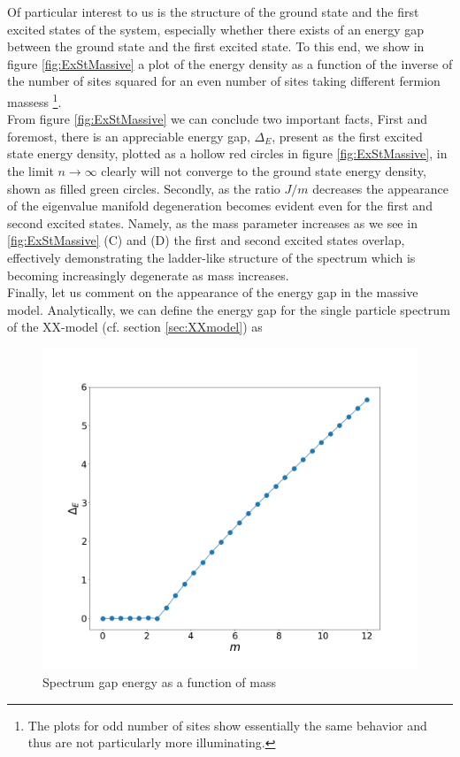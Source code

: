 Of particular interest to us is the structure of the ground state and the first excited states of the system, especially whether there exists of an energy gap between the ground state and the first excited state. To this end, we show in figure \ref{fig:ExStMassive} a plot of the energy density as a function of the inverse of the number of sites squared for an even number of sites taking different fermion massess \footnote{The plots for odd number of sites show essentially the same behavior and thus are not particularly more illuminating.}. \\

From figure \ref{fig:ExStMassive} we can conclude two important facts, First and foremost, there is an appreciable energy gap, $\Delta_E$, present as the first excited state energy density, plotted as a hollow red circles in figure \ref{fig:ExStMassive}, in the limit $n\to\infty$ clearly will not converge to the ground state energy density, shown as filled green circles. Secondly, as the ratio $J/m$ decreases the appearance of the eigenvalue manifold degeneration becomes evident even for the first and second excited states. Namely, as the mass parameter increases as we see in \ref{fig:ExStMassive} (C) and (D) the first and second excited states overlap, effectively demonstrating the ladder-like structure of the spectrum which is becoming increasingly degenerate as mass increases.\\


Finally, let us comment on the appearance of the energy gap in the massive model. Analytically, we can define the energy gap for the single particle spectrum of the XX-model (cf. section \ref{sec:XXmodel}) as

\begin{figure}
	\centering
	\includegraphics[scale=0.25]{figures/gap.png}
	\caption{Spectrum gap energy as a function of mass}
	\label{fig:gap}
\end{figure}

